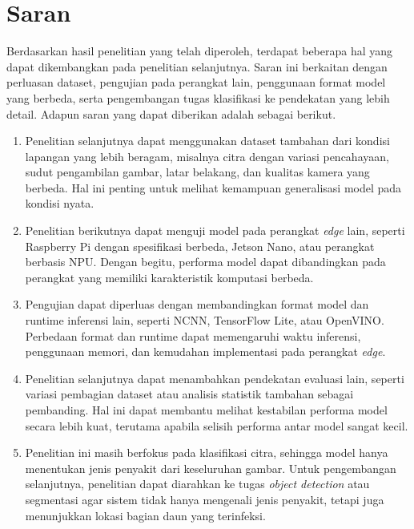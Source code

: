 \section{Saran}
\begin{sectioncontent}
    \hspace{\parindent}Berdasarkan hasil penelitian yang telah diperoleh, terdapat beberapa hal yang dapat dikembangkan pada penelitian selanjutnya. Saran ini berkaitan dengan perluasan dataset, pengujian pada perangkat lain, penggunaan format model yang berbeda, serta pengembangan tugas klasifikasi ke pendekatan yang lebih detail. Adapun saran yang dapat diberikan adalah sebagai berikut.

    \begin{enumerate}[leftmargin=0.75cm,label=\arabic*.]
        \item Penelitian selanjutnya dapat menggunakan dataset tambahan dari kondisi lapangan yang lebih beragam, misalnya citra dengan variasi pencahayaan, sudut pengambilan gambar, latar belakang, dan kualitas kamera yang berbeda. Hal ini penting untuk melihat kemampuan generalisasi model pada kondisi nyata.

        \item Penelitian berikutnya dapat menguji model pada perangkat \textit{edge} lain, seperti Raspberry Pi dengan spesifikasi berbeda, Jetson Nano, atau perangkat berbasis NPU. Dengan begitu, performa model dapat dibandingkan pada perangkat yang memiliki karakteristik komputasi berbeda.

        \item Pengujian dapat diperluas dengan membandingkan format model dan runtime inferensi lain, seperti NCNN, TensorFlow Lite, atau OpenVINO. Perbedaan format dan runtime dapat memengaruhi waktu inferensi, penggunaan memori, dan kemudahan implementasi pada perangkat \textit{edge}.

        \item Penelitian selanjutnya dapat menambahkan pendekatan evaluasi lain, seperti variasi pembagian dataset atau analisis statistik tambahan sebagai pembanding. Hal ini dapat membantu melihat kestabilan performa model secara lebih kuat, terutama apabila selisih performa antar model sangat kecil.

        \item Penelitian ini masih berfokus pada klasifikasi citra, sehingga model hanya menentukan jenis penyakit dari keseluruhan gambar. Untuk pengembangan selanjutnya, penelitian dapat diarahkan ke tugas \textit{object detection} atau segmentasi agar sistem tidak hanya mengenali jenis penyakit, tetapi juga menunjukkan lokasi bagian daun yang terinfeksi.
    \end{enumerate}
\end{sectioncontent}
